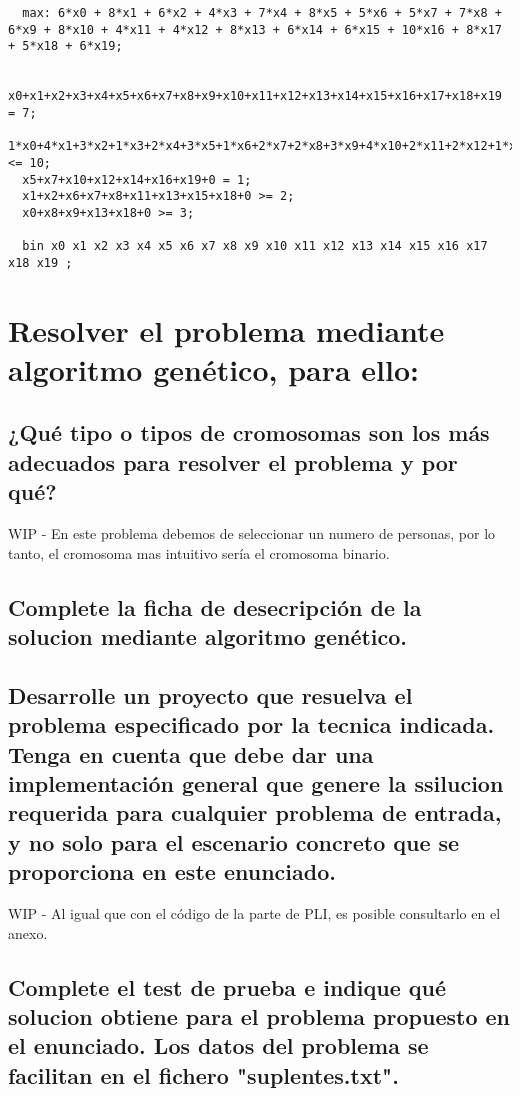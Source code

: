\documentclass[a4paper,12pt]{article}
\begin{document}
\begin{lstlisting}
  max: 6*x0 + 8*x1 + 6*x2 + 4*x3 + 7*x4 + 8*x5 + 5*x6 + 5*x7 + 7*x8 + 6*x9 + 8*x10 + 4*x11 + 4*x12 + 8*x13 + 6*x14 + 6*x15 + 10*x16 + 8*x17 + 5*x18 + 6*x19;

  x0+x1+x2+x3+x4+x5+x6+x7+x8+x9+x10+x11+x12+x13+x14+x15+x16+x17+x18+x19 = 7;
  1*x0+4*x1+3*x2+1*x3+2*x4+3*x5+1*x6+2*x7+2*x8+3*x9+4*x10+2*x11+2*x12+1*x13+3*x14+4*x15+5*x16+1*x17+2*x18+3*x19 <= 10;
  x5+x7+x10+x12+x14+x16+x19+0 = 1;
  x1+x2+x6+x7+x8+x11+x13+x15+x18+0 >= 2;
  x0+x8+x9+x13+x18+0 >= 3;

  bin x0 x1 x2 x3 x4 x5 x6 x7 x8 x9 x10 x11 x12 x13 x14 x15 x16 x17 x18 x19 ;
\end{lstlisting}



\section{Resolver el problema mediante algoritmo genético, para ello:}
\subsection{¿Qué tipo o tipos de cromosomas son los más adecuados para resolver el problema y por qué?}
WIP - En este problema debemos de seleccionar un numero de personas, por lo tanto, el cromosoma mas intuitivo sería el cromosoma binario.
\subsection{Complete la ficha de desecripción de la solucion mediante algoritmo genético.}

\subsection{Desarrolle un proyecto que resuelva el problema especificado por la tecnica indicada. Tenga en cuenta que debe dar una implementación general que genere la ssilucion requerida para cualquier problema de entrada, y no solo para el escenario concreto que se proporciona en este enunciado.}
WIP - Al igual que con el código de la parte de PLI, es posible consultarlo en el anexo.
\subsection{Complete el test de prueba e indique qué solucion obtiene para el problema propuesto en el enunciado. Los datos del problema se facilitan en el fichero "suplentes.txt".}
\end{document}
